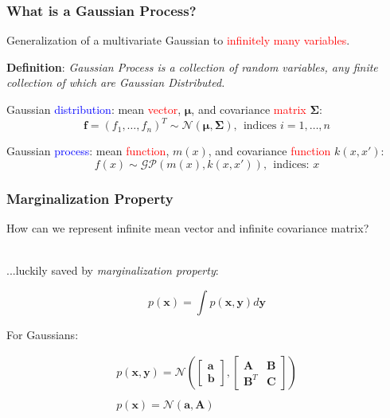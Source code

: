 \documentclass[10pt]{beamer}
\newcommand{\bx}{\mathbf{x}}
\newcommand{\by}{\mathbf{y}}
\newcommand{\ba}{\mathbf{a}}
\newcommand{\bb}{\mathbf{b}}
\newcommand{\bA}{\mathbf{A}}
\newcommand{\bB}{\mathbf{B}}
\newcommand{\bC}{\mathbf{C}}
\newcommand{\gp}{\mathcal{GP}}
\newcommand{\gaussN}{\mathcal{N}}
\newcommand{\bmu}{\boldsymbol{\mu}}
\newcommand{\bSig}{\boldsymbol{\Sigma}}
\begin{document}
  \begin{frame}
    \frametitle{What is a Gaussian Process?}
    Generalization of a multivariate Gaussian to \textcolor{red}{infinitely many variables}.

    \begin{block}{}
      \textbf{Definition}: \emph{Gaussian Process is a collection of random variables, any finite collection of which are Gaussian Distributed.}
    \end{block}

    \pause

    Gaussian \textcolor{blue}{distribution}: mean \textcolor{red}{vector}, $\bmu$, and covariance \textcolor{red}{matrix} $\bSig$:
    \begin{equation*}
      \mathbf{f} = (f_1,\dots,f_n)^T \sim \gaussN(\bmu,\bSig),~~\text{indices } i = 1,\dots,n
    \end{equation*}

    \pause

    Gaussian \textcolor{blue}{process}: mean \textcolor{red}{function}, $m(x)$, and covariance \textcolor{red}{function} $k(x,x')$:
    \begin{equation*}
      f(x) \sim \gp(m(x),k(x,x')),~~\text{indices: } x
    \end{equation*}
  \end{frame}

  \begin{frame}
    \frametitle{Marginalization Property}
    How can we represent infinite mean vector and infinite covariance matrix? \\~

    ...luckily saved by \emph{marginalization property}:

    \begin{equation*}
      p(\bx) = \int p(\bx,\by)d \by
    \end{equation*}

    \pause

    For Gaussians:

    \begin{equation*}
      \begin{array}{c}
        p(\bx, \by) = \gaussN \left(\begin{bmatrix} \ba \\ \bb \end{bmatrix}, \begin{bmatrix} \bA & \bB \\ \bB^T & \bC \end{bmatrix} \right) \\~\\
        p(\bx) = \gaussN(\ba,\bA)
      \end{array}
    \end{equation*}
  \end{frame}
\end{document}
